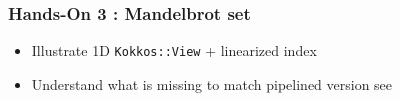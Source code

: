 \begin{frame}[fragile=singleslide]
  \frametitle{Hands-On 3 : Mandelbrot set}

  \begin{itemize}
  \item Illustrate 1D \texttt{Kokkos::View} + linearized index
  \item Understand what is missing to match pipelined version see
  \end{itemize}
  
\end{frame}